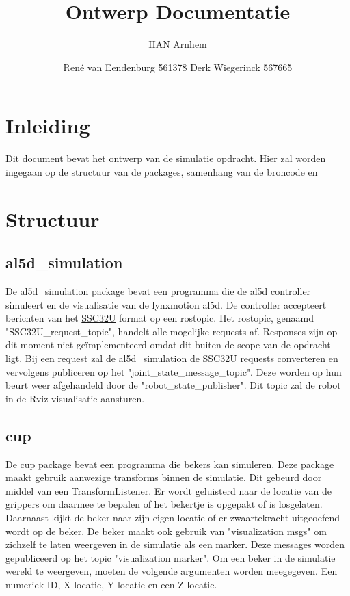 \documentclass[11pt,titlepage]{article}
\author{René van Eendenburg 561378 \cr Derk Wiegerinck 567665}
\title{Ontwerp Documentatie}
\subtitle{HAN Arnhem}{Versie 1}{WOR-World}
\begin{document}
\maketitle



\tableofcontents
\clearpage


\section{Inleiding}
Dit document bevat het ontwerp van de simulatie opdracht. Hier zal worden ingegaan op de structuur van de packages, samenhang van de broncode en 

\section{Structuur}

\subsection{al5d\_simulation}
De al5d\_simulation package bevat een programma die de al5d controller simuleert en de visualisatie van de lynxmotion al5d.\newline 
\newline
De controller accepteert berichten van het \href{https://www.robotshop.com/media/files/pdf2/lynxmotion_ssc-32u_usb_user_guide.pdf
}{SSC32U} format op een rostopic. Het rostopic, genaamd "SSC32U\_request\_topic", handelt alle mogelijke requests af. Responses zijn op dit moment niet geïmplementeerd omdat dit buiten de scope van de opdracht ligt.\newline
Bij een request zal de al5d\_simulation de SSC32U requests converteren en vervolgens publiceren op het "joint\_state\_message\_topic". Deze worden op hun beurt weer afgehandeld door de "robot\_state\_publisher". Dit topic zal de robot in de Rviz visualisatie aansturen.

\subsection{cup}
De cup package bevat een programma die bekers kan simuleren. Deze package maakt gebruik aanwezige transforms binnen de simulatie. Dit gebeurd door middel van een TransformListener. Er wordt geluisterd naar de locatie van de grippers om daarmee te bepalen of het bekertje is opgepakt of is losgelaten. Daarnaast kijkt de beker naar zijn eigen locatie of er zwaartekracht uitgeoefend wordt op de beker.
\newline
De beker maakt ook gebruik van "visualization msgs" om zichzelf te laten weergeven in de simulatie als een marker. Deze messages worden gepubliceerd op het topic "visualization marker".
\newline
Om een beker in de simulatie wereld te weergeven, moeten de volgende argumenten worden meegegeven. Een numeriek ID, X locatie, Y locatie en een Z locatie. 
\end{document}

